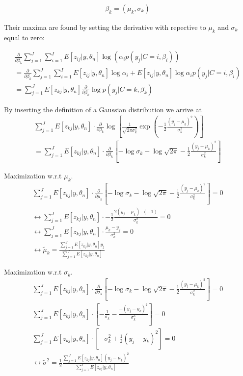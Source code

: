 \documentclass{article}  %
\begin{document}
\begin{align}
\beta_k = (\mu_k, \sigma_k)
\end{align}

Their maxima are found by setting the derivative with repective to $\mu_k$ and
$\sigma_k$ equal to zero:

\begin{align*}
\frac{\partial}{\partial\beta_k}\sum_{j=1}^J\sum_{i=1}^I
E[z_{ij}|y,\theta_n]\log(\alpha_i p(y_j|C=i,\beta_i)) \\
=\frac{\partial}{\partial\beta_k}\sum_{j=1}^J\sum_{i=1}^I
E[z_{ij}|y,\theta_n]\log\alpha_i + E\left[ z_{ij}|y,\theta_n\right]\log\alpha_i
p(y_j|C=i,\beta_i) \\
=\sum_{j=1}^J E[z_{kj}|y,\theta_n]\frac{\partial}{\partial\beta_k}\log
p(y_j|C=k,\beta_k)
\end{align*}

By inserting the definition of a Gaussian distribution we arrive at
\begin{align*}
\sum_{j=1}^J E[z_{kj}|y,\theta_n]\cdot
\frac{\partial}{\partial\beta_k}\log\left[\frac{1}{\sqrt{2\pi\sigma_k^2}}\exp\left(-\frac{1}{2}\frac{(y_j-\mu_k)^2}{\sigma_k^2}\right)\right]\\
=\sum_{j=1}^J E[z_{kj}|y,\theta_n]\cdot
\frac{\partial}{\partial\beta_k}\left[-\log \sigma_k -
\log\sqrt{2\pi}-\frac{1}{2}\frac{(y_j-\mu_k)^2}{\sigma_k^2}\right]
\end{align*}

Maximization w.r.t $\mu_k$.
\begin{align*} 
\sum_{j=1}^J E[z_{kj}|y,\theta_n]\cdot
\frac{\partial}{\partial\mu_k}\left[-\log \sigma_k -
\log\sqrt{2\pi}-\frac{1}{2}\frac{(y_j-\mu_k)^2}{\sigma_k^2}\right]=0\\
\leftrightarrow\sum_{j=1}^J E[z_{kj}|y,\theta_n]\cdot
-\frac{1}{2}\frac{2(y_j-\mu_k)\cdot (-1)}{\sigma_k^2}=0\\
\leftrightarrow\sum_{j=1}^J E[z_{kj}|y,\theta_n]\cdot
\frac{\mu_k-y_j}{\sigma_k^2}=0\\
\leftrightarrow \tilde\mu_k=\frac{\sum_{j=1}^J
E[z_{kj}|y,\theta_n]y_j}{\sum_{j=1}^J E[z_{kj}|y,\theta_n]}
\end{align*}

Maximization w.r.t $\sigma_k$.
\begin{align*} 
\sum_{j=1}^J E[z_{kj}|y,\theta_n]\cdot
\frac{\partial}{\partial\sigma_k}\left[-\log \sigma_k -
\log\sqrt{2\pi}-\frac{1}{2}\frac{(y_j-\mu_k)^2}{\sigma_k^2}\right]=0\\
\sum_{j=1}^J E[z_{kj}|y,\theta_n] \cdot
\left[-\frac{1}{\sigma_k}-\frac{-(y_j-y_k)^2}{\sigma_k^3}\right]=0\\
\sum_{j=1}^J E[z_{kj}|y,\theta_n] \cdot \left[-\sigma_k^2 +
\frac{1}{2}(y_j-y_k)^2\right] = 0\\
\leftrightarrow\tilde \sigma^2 = \frac{1}{2}\frac{\sum_{j=1}^J
E[z_{kj}|y,\theta_n](y_j-\mu_k)^2}{\sum_{j=1}^J E[z_{kj}|y,\theta_n]}
\end{align*}
\end{document}
